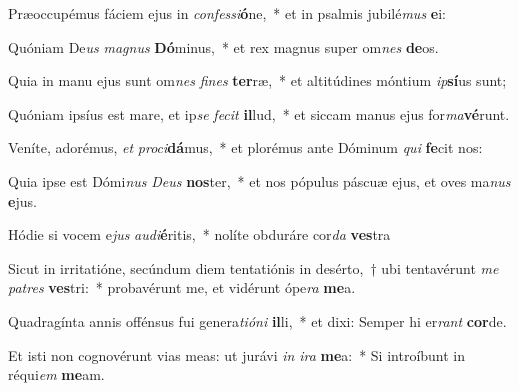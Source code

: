 \item Præoccupémus fáciem ejus in \textit{con}\textit{fes}\textit{si}\textbf{ó}ne,~* et in psalmis jubilé\textit{mus} \textbf{e}i:
\item Quóniam De\textit{us} \textit{ma}\textit{gnus} \textbf{Dó}minus,~* et rex magnus super om\textit{nes} \textbf{de}os.
\item Quia in manu ejus sunt om\textit{nes} \textit{fi}\textit{nes} \textbf{ter}ræ,~* et altitúdines móntium \textit{ip}\textbf{sí}us sunt;
\item Quóniam ipsíus est mare, et ip\textit{se} \textit{fe}\textit{cit} \textbf{il}lud,~* et siccam manus ejus for\textit{ma}\textbf{vé}runt.
\item Veníte, adorémus, \textit{et} \textit{pro}\textit{ci}\textbf{dá}mus,~* et plorémus ante Dóminum \textit{qui} \textbf{fe}cit nos:
\item Quia ipse est Dómi\textit{nus} \textit{De}\textit{us} \textbf{nos}ter,~* et nos pópulus páscuæ ejus, et oves ma\textit{nus} \textbf{e}jus.
\item Hódie si vocem e\textit{jus} \textit{au}\textit{di}\textbf{é}ritis,~* nolíte obduráre cor\textit{da} \textbf{ves}tra
\item Sicut in irritatióne, secúndum diem tentatiónis in desérto,~† ubi tentavérunt \textit{me} \textit{pa}\textit{tres} \textbf{ves}tri:~* probavérunt me, et vidérunt ópe\textit{ra} \textbf{me}a.
\item Quadragínta annis offénsus fui genera\textit{ti}\textit{ó}\textit{ni} \textbf{il}li,~* et dixi: Semper hi er\textit{rant} \textbf{cor}de.
\item Et isti non cognovérunt vias meas: ut jurávi \textit{in} \textit{i}\textit{ra} \textbf{me}a:~* Si introíbunt in réqui\textit{em} \textbf{me}am.
